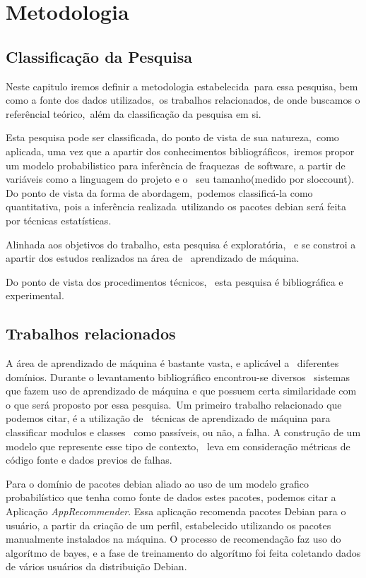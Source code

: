 \chapter{Metodologia}

\section{Classificação da Pesquisa}

Neste capitulo iremos definir a metodologia estabelecida\ 
para essa pesquisa, bem como a fonte dos dados utilizados,\ 
os trabalhos relacionados, de onde buscamos o referêncial teórico,\
além da classificação da pesquisa em si.

Esta pesquisa pode ser classificada, do ponto de vista de sua natureza,\ 
como aplicada, uma vez que a apartir dos conhecimentos bibliográficos,\
iremos propor um modelo probabilistico para inferência de fraquezas\
de software, a partir de variáveis como a linguagem do projeto e o \
seu tamanho(medido por sloccount). Do ponto de vista da forma de abordagem,\
podemos classificá-la como quantitativa, pois a inferência realizada\ 
utilizando os pacotes debian será feita por técnicas estatísticas.

Alinhada aos objetivos do trabalho, esta pesquisa é exploratória, \ 
e se constroi a apartir dos estudos realizados na área de \ 
aprendizado de máquina.

Do ponto de vista dos procedimentos técnicos, \ 
esta pesquisa é bibliográfica e experimental.

\section{Trabalhos relacionados}

A área de aprendizado de máquina é bastante vasta, e aplicável a \ 
diferentes domínios.
Durante o levantamento bibliográfico encontrou-se diversos \ 
sistemas que fazem uso de aprendizado de máquina e que possuem certa similaridade com o que será proposto por essa pesquisa.\
Um primeiro trabalho relacionado que podemos citar, é a utilização de \ 
técnicas de aprendizado de máquina para classificar modulos e classes \ 
como passíveis, ou não, a falha\cite{Malhotra}.
A construção de um modelo que represente esse tipo de contexto, \ 
leva em consideração métricas de código fonte e dados previos de falhas\cite{Malhotra}.

Para o domínio de pacotes debian aliado ao uso de um modelo grafico probabilístico que tenha como fonte de dados estes pacotes, podemos citar a Aplicação \textit{AppRecommender}. Essa aplicação recomenda pacotes Debian para o usuário,
a partir da criação de um perfil, estabelecido utilizando os pacotes manualmente instalados na máquina.
O processo de recomendação faz uso do algorítmo de bayes, e a fase de treinamento do algorítmo foi feita coletando dados de vários usuários da distribuição Debian.

